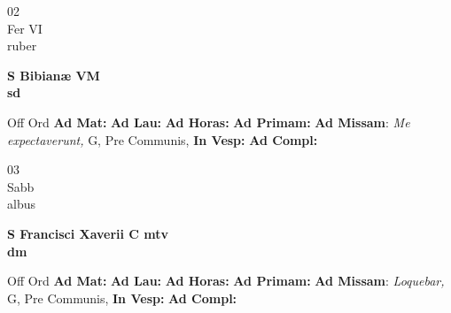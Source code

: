 \documentclass[10pt, openany]{book}
\begin{document}
        \begin{center}
            \begin{minipage}{3.5in}
                \vspace{2em}
                \begin{minipage}{0.5in}
                    {\Huge 02} \\
                    {\normalsize Fer VI} \\
                    {\normalsize ruber}
                \end{minipage}
                \begin{minipage}{3.0in}
                    \textbf{ \large S Bibianæ VM \\
                    \textnormal{\normalsize sd}} \\ 
                \end{minipage}
                \begin{justify}Off Ord
                    \textbf{Ad Mat: }
                    \textbf{Ad Lau: }
                    \textbf{Ad Horas: }
                    \textbf{Ad Primam: }\textbf{Ad Missam}: \textit{Me expectaverunt,} G, Pre Communis,  
                    \textbf{In Vesp: }
                    \textbf{Ad Compl: }
                \end{justify}
            \end{minipage}
        \end{center}
    
        \begin{center}
            \begin{minipage}{3.5in}
                \vspace{2em}
                \begin{minipage}{0.5in}
                    {\Huge 03} \\
                    {\normalsize Sabb} \\
                    {\normalsize albus}
                \end{minipage}
                \begin{minipage}{3.0in}
                    \textbf{ \large S Francisci Xaverii C mtv \\
                    \textnormal{\normalsize dm}} \\ 
                \end{minipage}
                \begin{justify}Off Ord
                    \textbf{Ad Mat: }
                    \textbf{Ad Lau: }
                    \textbf{Ad Horas: }
                    \textbf{Ad Primam: }\textbf{Ad Missam}: \textit{Loquebar,} G, Pre Communis,  
                    \textbf{In Vesp: }
                    \textbf{Ad Compl: }
                \end{justify}
            \end{minipage}
        \end{center}
    
\end{document}
